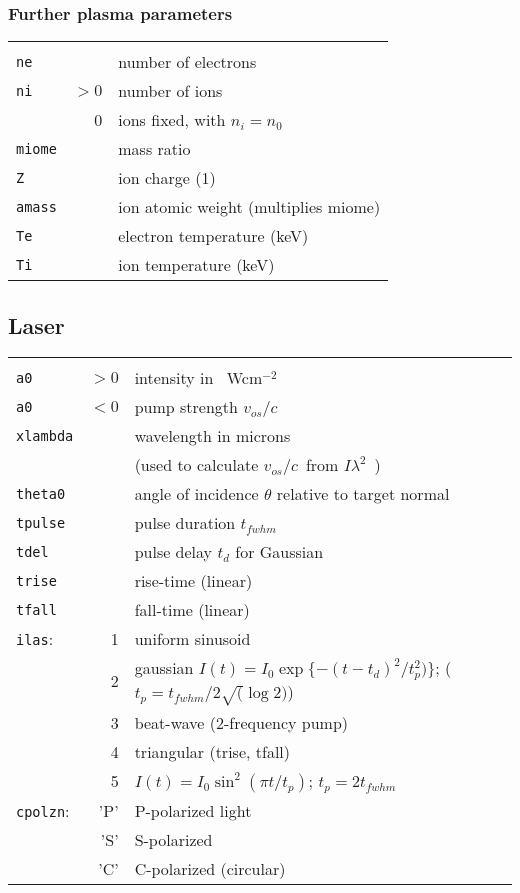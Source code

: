 \documentclass[11pt]{article}
\newcommand{\Ilam}{$I\lambda^{2}$}
\newcommand{\Wcm}{~Wcm$^{-2}$}
\newcommand{\voc}{$v_{os}/c$}
\begin{document}
\subsubsection{Further plasma parameters} 
\begin{tabular}{lrl}
\hline\\
\texttt{ne}& & number of electrons\\ 
\texttt{ni} & $>0$ & number of ions \\
	    & 0 & ions fixed, with $n_i=n_0$ \\ 
\texttt{miome} & & mass ratio \\ 
\texttt{Z} & & ion charge (1) \\ 
\texttt{amass} & & ion atomic weight (multiplies miome) \\ 
\texttt{Te} & & electron temperature (keV)\\ 
\texttt{Ti} & & ion temperature (keV)\\
\end{tabular}

\subsection{Laser} 
\begin{tabular}{lrl}
\hline \\
\texttt{a0}& $>0$ &intensity in \Wcm\ \\ 
\texttt{a0}& $<0$ &pump strength \voc \\ 
\texttt{xlambda} & & wavelength in microns \\
&& (used to calculate \voc\ from \Ilam\ ) \\
\texttt{theta0} && angle of incidence $\theta$ relative to target normal\\ 
\texttt{tpulse} & & pulse duration $t_{fwhm}$ \\
\texttt{tdel} & & pulse delay $t_d$ for Gaussian \\
\texttt{trise} & & rise-time (linear) \\
\texttt{tfall} & & fall-time (linear) \\
\texttt{ilas}:& 1 & uniform sinusoid \\ 
 & 2 & gaussian $I(t) = I_0\exp \{-(t-t_d)^2/t_p^2)\}$;  ($t_p=t_{fwhm}/2\sqrt(\log2)$) \\ 
 & 3 & beat-wave (2-frequency pump) \\
 & 4 & triangular (trise, tfall) \\ 
 & 5 & $I(t) = I_0\sin^2 (\pi t/t_p)$; $t_p=2 t_{fwhm}$\\
\texttt{cpolzn}:&'P' & P-polarized light \\ 
	 &'S' & S-polarized \\ 
  	 & 'C'& C-polarized (circular)\\
\end{tabular} 
\end{document}
